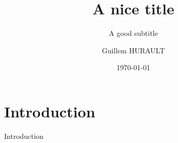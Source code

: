 \documentclass[10pt]{beamer}
\title{A nice title}
\subtitle{A good subtitle}
\date{\today}
\author{Guillem HURAULT}
\begin{document}
\maketitle

\section{Introduction}

\begin{frame}{Introduction}

\end{frame}

\begin{frame}[standout]

\end{frame}
\end{document}
